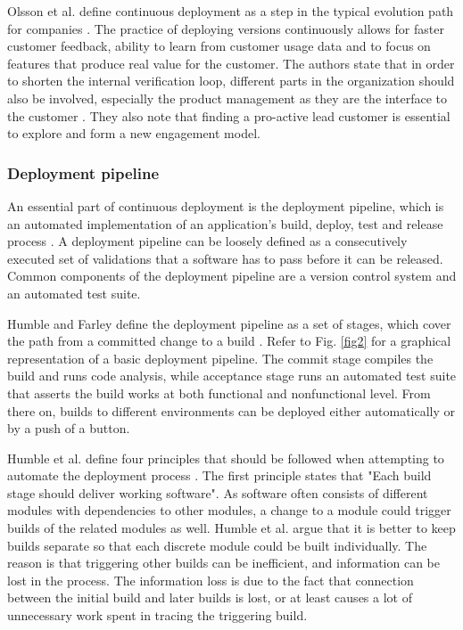 \documentclass[english]{tktltiki2}
\theoremstyle{definition}
\theoremstyle{remark}
\begin{document}
Olsson et al. define continuous deployment as a step in the typical evolution path for companies \cite{olsson2012climbing}. The practice of deploying versions continuously allows for faster customer feedback, ability to learn from customer usage data and to focus on features that produce real value for the customer. The authors state that in order to shorten the internal verification loop, different parts in the organization should also be involved, especially the product management as they are the interface to the customer \cite{olsson2012climbing}. They also note that finding a pro-active lead customer is essential to explore and form a new engagement model.

\subsubsection{Deployment pipeline}
An essential part of continuous deployment is the deployment pipeline, which is an automated implementation of an application's build, deploy, test and release process \cite{cdbook}. A deployment pipeline can be loosely defined as a consecutively executed set of validations that a software has to pass before it can be released. Common components of the deployment pipeline are a version control system and an automated test suite.

Humble and Farley define the deployment pipeline as a set of stages, which cover the path from a committed change to a build \cite{cdbook}. Refer to Fig. \ref{fig2} for a graphical representation of a basic deployment pipeline. The commit stage compiles the build and runs code analysis, while acceptance stage runs an automated test suite that asserts the build works at both functional and nonfunctional level. From there on, builds to different environments can be deployed either automatically or by a push of a button.

Humble et al. define four principles that should be followed when attempting to automate the deployment process \cite{humble2006deployment}. The first principle states that "Each build stage should deliver working software". As software often consists of different modules with dependencies to other modules, a change to a module could trigger builds of the related modules as well. Humble et al. argue that it is better to keep builds separate so that each discrete module could be built individually. The reason is that triggering other builds can be inefficient, and information can be lost in the process. The information loss is due to the fact that connection between the initial build and later builds is lost, or at least causes a lot of unnecessary work spent in tracing the triggering build. 
\end{document}
